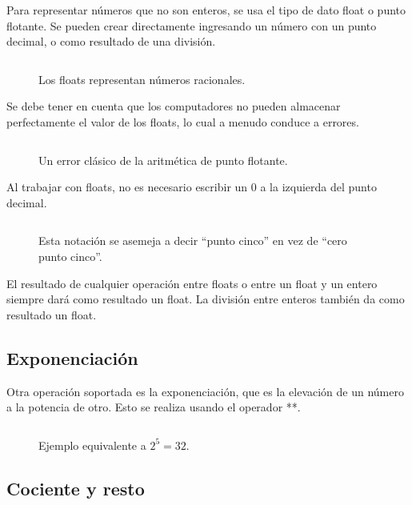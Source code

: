 \documentclass{article}
\newcommand{\doble}[1]{``#1''}
\begin{document}
Para representar números que no son enteros, se usa el tipo de dato float o punto flotante. Se pueden crear directamente ingresando un número con un punto decimal, o como resultado de una división.

\begin{figure}[ht!]
  \inputminted[frame=single, linenos]{python}{codigo/cap2/float_1.py}
  \caption{Los floats representan números racionales.}
\end{figure}

Se debe tener en cuenta que los computadores no pueden almacenar perfectamente el valor de los floats, lo cual a menudo conduce a errores.

\begin{figure}[ht!]
  \inputminted[frame=single, linenos]{python}{codigo/cap2/error_float.py}
  \caption{Un error clásico de la aritmética de punto flotante.}
\end{figure}

Al trabajar con floats, no es necesario escribir un 0 a la izquierda del punto decimal.

\begin{figure}[ht!]
  \inputminted[frame=single, linenos]{python}{codigo/cap2/float_2.py}
  \caption{Esta notación se asemeja a decir \doble{punto cinco} en vez de \doble{cero punto cinco}.}
\end{figure}

El resultado de cualquier operación entre floats o entre un float y un entero siempre dará como resultado un float. La división entre enteros también da como resultado un float.


\subsection{Exponenciación}

Otra operación soportada es la exponenciación, que es la elevación de un número a la potencia de otro. Esto se realiza usando el operador **.

\begin{figure}[ht!]
  \inputminted[frame=single, linenos]{python}{codigo/cap2/potencia.py}
  \caption{Ejemplo equivalente a $2 ^ 5 = 32$.}
\end{figure}

\subsection{Cociente y resto}
\end{document}
